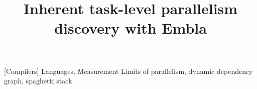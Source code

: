 \documentclass[natbib]{sigplanconf}
\begin{document}
\title{Inherent task-level parallelism discovery with Embla}

          
\maketitle 



[Compilers]
\terms
Languages, Measurement
\keywords
Limits of parallelism, dynamic dependency graph, spaghetti stack









{}
\end{document}
